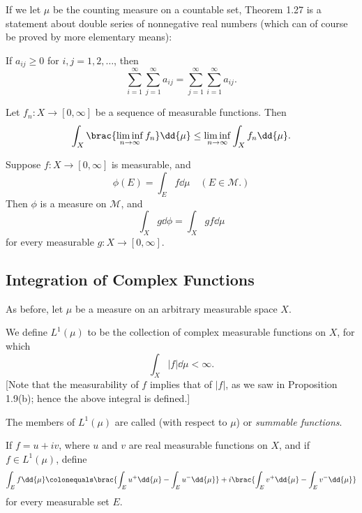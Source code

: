 If we let $\mu$ be the counting measure on a countable set, Theorem 1.27 is a statement about double series of nonnegative real numbers (which can of course be proved by more elementary means): 

\begin{corollary}
If $a_{ij}\ge0$ for $i,j=1,2,\dots$, then
\[\sum_{i=1}^{\infty}\sum_{j=1}^{\infty}a_{ij}=\sum_{j=1}^{\infty}\sum_{i=1}^{\infty}a_{ij}.\]
\end{corollary}

\begin{theorem}
Let $f_n:X\to[0,\infty]$ be a sequence of measurable functions. Then
\begin{equation}
\int_{X}\brac{\liminf_{n\to\infty}f_n}\dd{\mu}\le\liminf_{n\to\infty}\int_{X}f_n\dd{\mu}.
\end{equation}
\end{theorem}

\begin{proposition}
Suppose $f\colon X\to[0,\infty]$ is measurable, and
\[\phi(E)=\int_{E}f\dd{\mu}\quad(E\in\mathcal{M}.)\]
Then $\phi$ is a measure on $\mathcal{M}$, and
\begin{equation}
\int_{X}g\dd{\phi}=\int_{X}gf\dd{\mu}
\end{equation}
for every measurable $g\colon X\to[0,\infty]$.
\end{proposition}
\pagebreak

\subsection{Integration of Complex Functions}
As before, let $\mu$ be a measure on an arbitrary measurable space $X$.

\begin{definition}
We define $L^1(\mu)$ to be the collection of complex measurable functions on $X$, for which
\[\int_{X}|f|\dd{\mu}<\infty.\]
[Note that the measurability of $f$ implies that of $|f|$, as we saw in Proposition 1.9(b); hence the above integral is defined.]

The members of $L^1(\mu)$ are called  (with
respect to $\mu$) or \emph{summable functions}.
\end{definition}

If $f=u+iv$, where $u$ and $v$ are real measurable functions on $X$, and if $f\in L^1(\mu)$, define
\[\int_{E}f\dd{\mu}\colonequals\brac{\int_{E}u^+\dd{\mu}-\int_{E}u^-\dd{\mu}}+i\brac{\int_{E}v^+\dd{\mu}-\int_{E}v^-\dd{\mu}}\]
for every measurable set $E$.

